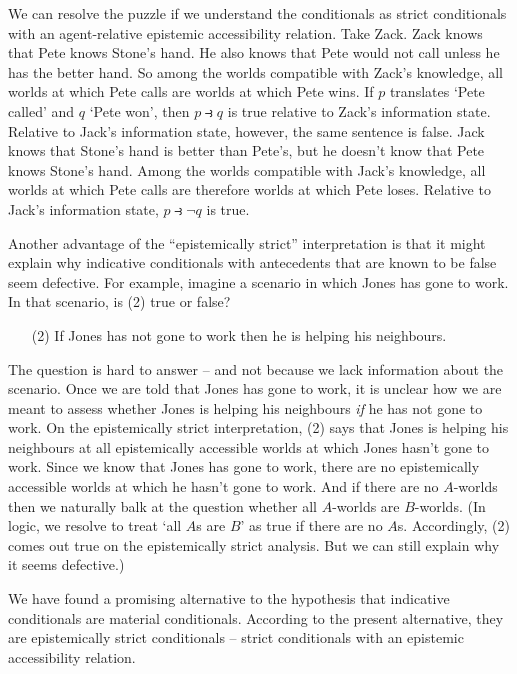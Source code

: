 We can resolve the puzzle if we understand the conditionals as strict
conditionals with an agent-relative epistemic accessibility relation. Take Zack.
Zack knows that Pete knows Stone's hand. He also knows that Pete would not call
unless he has the better hand. So among the worlds compatible with Zack's
knowledge, all worlds at which Pete calls are worlds at which Pete wins. If $p$
translates `Pete called' and $q$ `Pete won', then $p \strictif q$ is true
relative to Zack's information state. Relative to Jack's information state,
however, the same sentence is false. Jack knows that Stone's hand is better than
Pete's, but he doesn't know that Pete knows Stone's hand. Among the worlds
compatible with Jack's knowledge, all worlds at which Pete calls are therefore
worlds at which Pete loses. Relative to Jack's information state,
$p \strictif \neg q$ is true.

Another advantage of the ``epistemically strict'' interpretation is that it
might explain why indicative conditionals with antecedents that are known to be
false seem defective. For example, imagine a scenario in which Jones has gone to
work. In that scenario, is (2) true or false?
\begin{enumerate}[leftmargin=10mm]
  \item[(2)] If Jones has not gone to work then he is helping his neighbours.
\end{enumerate}
The question is hard to answer -- and not because we lack information about the
scenario. Once we are told that Jones has gone to work, it is unclear how we are
meant to assess whether Jones is helping his neighbours \emph{if} he has not
gone to work. On the epistemically strict interpretation, (2) says that Jones is
helping his neighbours at all epistemically accessible worlds at which Jones
hasn't gone to work. Since we know that Jones has gone to work, there are no
epistemically accessible worlds at which he hasn't gone to work. And if there
are no $A$-worlds then we naturally balk at the question whether all $A$-worlds
are $B$-worlds. (In logic, we resolve to treat `all $A$s are $B$' as true if
there are no $A$s. Accordingly, (2) comes out true on the epistemically strict
analysis. But we can still explain why it seems defective.)

We have found a promising alternative to the hypothesis that indicative
conditionals are material conditionals. According to the present alternative,
they are epistemically strict conditionals -- strict conditionals with an
epistemic accessibility relation.

